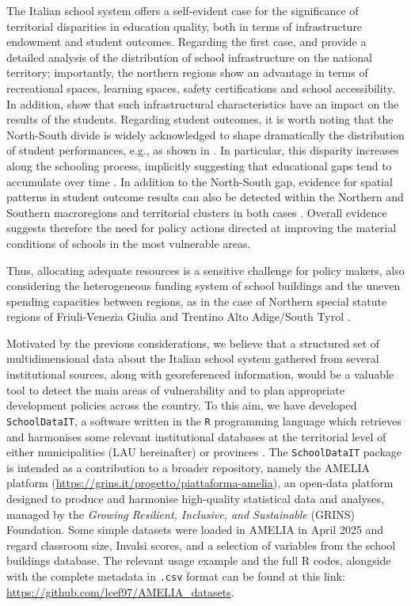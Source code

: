 \documentclass[openany, 11pt, oneside]{book}
\begin{document}
The Italian school system offers a self-evident case for the significance of territorial disparities in education quality, both in terms of infrastructure endowment and student outcomes. Regarding the first case,  \cite{Garlaschi} and \cite{BDI} provide a detailed analysis of the distribution of school infrastructure on the national territory; importantly, the northern regions show an advantage in terms of recreational spaces, learning spaces, safety certifications and school accessibility. In addition, \cite{BDI} show that such infrastructural characteristics have an impact on the results of the students. Regarding student outcomes, it is worth noting that the North-South divide is widely acknowledged to shape dramatically the distribution of student performances, e.g., as shown in \cite{Agasisti}. In particular, this disparity increases along the schooling process, implicitly suggesting that educational gaps tend to accumulate over time \parencite{Invalsi2020}. In addition to the North-South gap,  evidence for spatial patterns in student outcome results can also be detected within the Northern and Southern macroregions and territorial clusters in both cases \parencite[][respectively]{bag:do:north, do:bag:mar:south}. Overall evidence suggests therefore the need for policy actions directed at improving the material conditions of schools in the most vulnerable areas.

Thus, allocating adequate resources is a sensitive challenge for policy makers, also considering the heterogeneous funding system of school buildings and the uneven spending capacities between regions, as in the case of Northern special statute regions of Friuli-Venezia Giulia and Trentino Alto Adige/South Tyrol \cite[see][]{BDI}.

Motivated by the previous considerations, we believe that a structured set of multidimensional data about the Italian school system gathered from several institutional sources, along with georeferenced information, would be a valuable tool to detect the main areas of vulnerability and to plan appropriate development policies across the country. To this aim, we have developed \texttt{SchoolDataIT}, a software written in the \texttt{R} programming language \parencite{R} which retrieves and harmonises some relevant institutional databases at the territorial level of either municipalities (LAU hereinafter) or provinces \parencite[NUTS-3 henceforth, ][]{NUTS2024}. 
The \texttt{SchoolDataIT} package is intended as a contribution to a broader repository, namely the AMELIA platform (\url{https://grins.it/progetto/piattaforma-amelia}), an open-data platform designed to produce and harmonise high-quality statistical data and analyses, managed by the \textit{Growing Resilient, Inclusive, and Sustainable} (GRINS) Foundation. Some simple datasets were loaded in AMELIA in April 2025 and regard classroom size, Invalsi scores, and a selection of variables from the school buildings database. The relevant usage example and the full R codes, alongside with the complete metadata in \texttt{.csv} format can be found at this link: \url{https://github.com/lcef97/AMELIA_datasets}.
\end{document}
